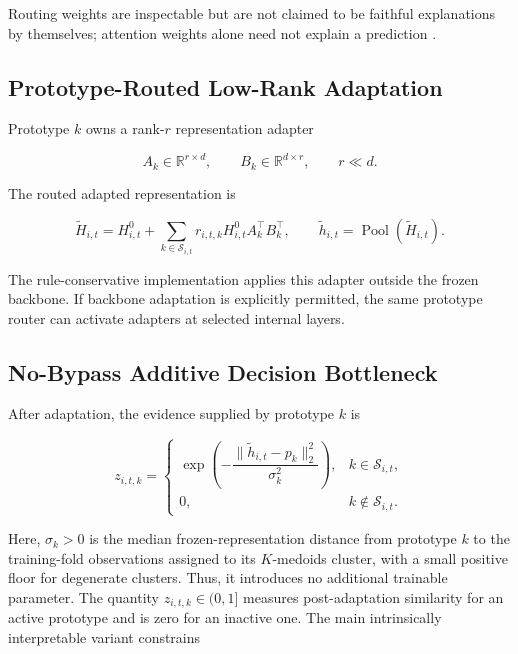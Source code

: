 \documentclass[11pt]{article}
\newcommand{\R}{\mathbb{R}}
\begin{document}
Routing weights are inspectable but are not claimed to be faithful
explanations by themselves; attention weights alone need not explain a
prediction \citep{jain2019attention}.

\subsection{Prototype-Routed Low-Rank Adaptation}

Prototype $k$ owns a rank-$r$ representation adapter

\begin{equation}
A_k\in\R^{r\times d},
\qquad
B_k\in\R^{d\times r},
\qquad
r\ll d.
\end{equation}

The routed adapted representation is

\begin{equation}
\widetilde H_{i,t}
=
H^0_{i,t}
+
\sum_{k\in\mathcal S_{i,t}}
r_{i,t,k}
H^0_{i,t}A_k^\top B_k^\top,
\qquad
\widetilde h_{i,t}
=
\operatorname{Pool}(\widetilde H_{i,t}).
\end{equation}

The rule-conservative implementation applies this adapter outside the frozen
backbone. If backbone adaptation is explicitly permitted, the same
prototype router can activate adapters at selected internal layers.

\subsection{No-Bypass Additive Decision Bottleneck}

After adaptation, the evidence supplied by prototype $k$ is

\begin{equation}
z_{i,t,k}
=
\begin{cases}
\exp
\left(
-
\dfrac{
\|\widetilde h_{i,t}-p_k\|_2^2
}{
\sigma_k^2
}
\right),
&
k\in\mathcal S_{i,t},
\\[2ex]
0,
&
k\notin\mathcal S_{i,t}.
\end{cases}
\end{equation}

Here, $\sigma_k>0$ is the median frozen-representation distance from prototype
$k$ to the training-fold observations assigned to its $K$-medoids cluster,
with a small positive floor for degenerate clusters. Thus, it introduces no
additional trainable parameter.
The quantity $z_{i,t,k}\in(0,1]$ measures post-adaptation similarity for an
active prototype and is zero for an inactive one. The main intrinsically
interpretable variant constrains
\end{document}
